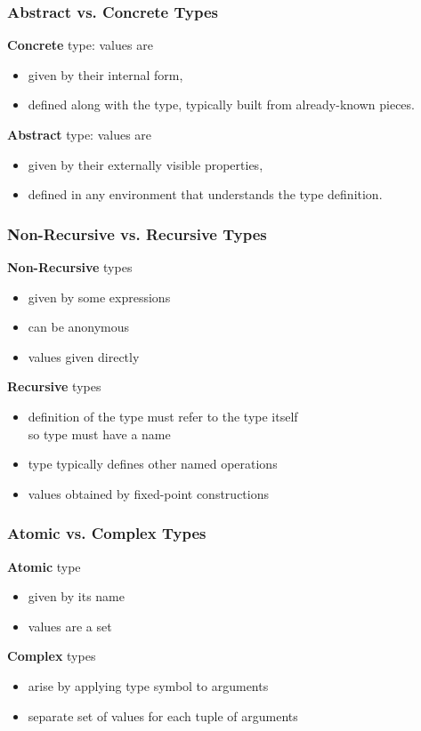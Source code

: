 \begin{frame}\frametitle{Abstract vs. Concrete Types}
\textbf{Concrete} type: values are
\begin{itemize}
\item given by their internal form,
\item defined along with the type, typically built from already-known pieces.
\end{itemize}

\textbf{Abstract} type: values are
\begin{itemize}
\item given by their externally visible properties,
\item defined in any environment that understands the type definition.
\end{itemize}
\end{frame}

\begin{frame}\frametitle{Non-Recursive vs. Recursive Types}
\textbf{Non-Recursive} types 
\begin{itemize}
\item given by some expressions
\item can be anonymous
\item values given directly
\end{itemize}

\textbf{Recursive} types
\begin{itemize}
\item definition of the type must refer to the type itself\\
so type must have a name
\item type typically defines other named operations
\item values obtained by fixed-point constructions
\end{itemize}
\end{frame}

\begin{frame}\frametitle{Atomic vs. Complex Types}
\textbf{Atomic} type
\begin{itemize}
\item given by its name
\item values are a set
\end{itemize}

\textbf{Complex} types
\begin{itemize}
\item arise by applying type symbol to arguments\\
\item separate set of values for each tuple of arguments
\end{itemize}
\end{frame}

